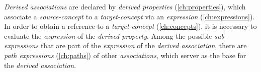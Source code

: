 \emph{Derived associations} are declared by \emph{derived properties} (\ref{ch:properties}),
which associate a \emph{source-concept} to a \emph{target-concept}
via an \emph{expression} (\ref{ch:expressions}).
In order to obtain a reference to a \emph{target-concept} (\ref{ch:concepts}),
it is necessary to evaluate the \emph{expression} of the \emph{derived property}.
Among the possible \emph{sub-expressions}
that are part of the \emph{expression} of the \emph{derived association},
there are \emph{path expressions} (\ref{ch:paths}) of other \emph{associations},
which server as the base for the \emph{derived association}.
